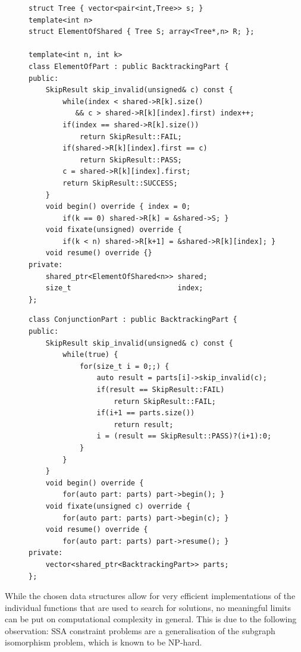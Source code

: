 \begin{figure}[p]
\begin{lstlisting}[language=MyCpp,basicstyle=\linespread{0.90}\ttfamily]
struct Tree { vector<pair<int,Tree>> s; }
template<int n>
struct ElementOfShared { Tree S; array<Tree*,n> R; };

template<int n, int k>
class ElementOfPart : public BacktrackingPart {
public:
    SkipResult skip_invalid(unsigned& c) const {
        while(index < shared->R[k].size()
           && c > shared->R[k][index].first) index++;
        if(index == shared->R[k].size())
            return SkipResult::FAIL;
        if(shared->R[k][index].first == c)
            return SkipResult::PASS;
        c = shared->R[k][index].first;
        return SkipResult::SUCCESS;
    }
    void begin() override { index = 0;
        if(k == 0) shared->R[k] = &shared->S; }
    void fixate(unsigned) override {
        if(k < n) shared->R[k+1] = &shared->R[k][index]; }
    void resume() override {}
private:
    shared_ptr<ElementOfShared<n>> shared;
    size_t                         index;
};
\end{lstlisting}
\begin{lstlisting}[language=MyCpp,basicstyle=\linespread{0.90}\ttfamily,
                   label={partimplementations},caption=
   {{\tt BacktrackingPart} is implemented for element-of constraints and
    conjunction constraints.
    The struct {\tt ElementOfShared} corresponds to
    $\protect{(R_k[E_S](M,x))_{k=1\dots n}}$ in \Cref{theo:theo1}.
    \parfillskip=0pt}]
class ConjunctionPart : public BacktrackingPart {
public:
    SkipResult skip_invalid(unsigned& c) const {
        while(true) {
            for(size_t i = 0;;) {
                auto result = parts[i]->skip_invalid(c);
                if(result == SkipResult::FAIL)
                    return SkipResult::FAIL;
                if(i+1 == parts.size())
                    return result;
                i = (result == SkipResult::PASS)?(i+1):0;
            }
        }
    }
    void begin() override {
        for(auto part: parts) part->begin(); }
    void fixate(unsigned c) override {
        for(auto part: parts) part->begin(c); }
    void resume() override {
        for(auto part: parts) part->resume(); }
private:
    vector<shared_ptr<BacktrackingPart>> parts;
};
\end{lstlisting}
\end{figure}

    While the chosen data structures allow for very efficient implementations
    of the individual functions that are used to search for solutions, no
    meaningful limits can be put on computational complexity in general.
    This is due to the following observation:
    SSA constraint problems are a generalisation of the subgraph isomorphism
    problem, which is known to be NP-hard.

